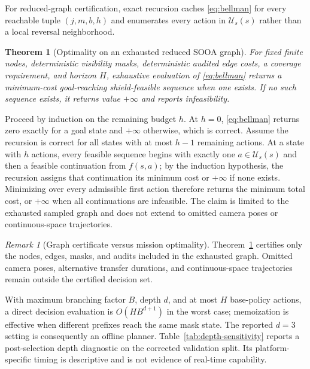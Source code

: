\documentclass{IEEEtaes}
\newtheorem{theorem}{Theorem}
\theoremstyle{remark}
\newtheorem{remark}{Remark}
\theoremstyle{plain}
\begin{document}
For reduced-graph certification, exact recursion caches \eqref{eq:bellman} for every reachable tuple $(j,m,b,h)$ and enumerates every action in $\mathcal U_s(s)$ rather than a local reversal neighborhood.

\begin{theorem}[Optimality on an exhausted reduced SOOA graph]
\label{thm:reduced-optimality}
For fixed finite nodes, deterministic visibility masks, deterministic audited edge costs, a coverage requirement, and horizon $H$, exhaustive evaluation of \eqref{eq:bellman} returns a minimum-cost goal-reaching shield-feasible sequence when one exists. If no such sequence exists, it returns value $+\infty$ and reports infeasibility.
\end{theorem}

\begin{IEEEproof}
Proceed by induction on the remaining budget $h$. At $h=0$, \eqref{eq:bellman} returns zero exactly for a goal state and $+\infty$ otherwise, which is correct. Assume the recursion is correct for all states with at most $h-1$ remaining actions. At a state with $h$ actions, every feasible sequence begins with exactly one $a\in\mathcal U_s(s)$ and then a feasible continuation from $f(s,a)$; by the induction hypothesis, the recursion assigns that continuation its minimum cost or $+\infty$ if none exists. Minimizing over every admissible first action therefore returns the minimum total cost, or $+\infty$ when all continuations are infeasible. The claim is limited to the exhausted sampled graph and does not extend to omitted camera poses or continuous-space trajectories.
\end{IEEEproof}

\begin{remark}[Graph certificate versus mission optimality]
Theorem~\ref{thm:reduced-optimality} certifies only the nodes, edges, masks, and audits included in the exhausted graph. Omitted camera poses, alternative transfer durations, and continuous-space trajectories remain outside the certified decision set.
\end{remark}

With maximum branching factor $B$, depth $d$, and at most $H$ base-policy actions, a direct decision evaluation is $O(HB^{d+1})$ in the worst case; memoization is effective when different prefixes reach the same mask state. The reported $d=3$ setting is consequently an offline planner. Table~\ref{tab:depth-sensitivity} reports a post-selection depth diagnostic on the corrected validation split. Its platform-specific timing is descriptive and is not evidence of real-time capability.
\end{document}

